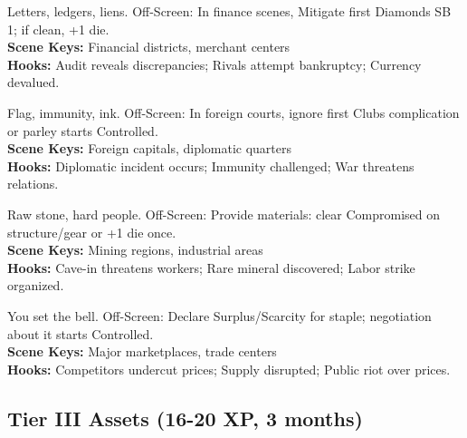\documentclass[12pt]{article}
\begin{document}
\begin{description}[leftmargin=*]
  \item[\textbf{Banking Charter}] Letters, ledgers, liens. Off-Screen: In finance scenes, Mitigate first Diamonds SB 1; if clean, +1 die. \\
  \textbf{Scene Keys:} Financial districts, merchant centers \\
  \textbf{Hooks:} Audit reveals discrepancies; Rivals attempt bankruptcy; Currency devalued.

  \item[\textbf{Diplomatic Enclave}] Flag, immunity, ink. Off-Screen: In foreign courts, ignore first Clubs complication or parley starts Controlled. \\
  \textbf{Scene Keys:} Foreign capitals, diplomatic quarters \\
  \textbf{Hooks:} Diplomatic incident occurs; Immunity challenged; War threatens relations.

  \item[\textbf{Mine/Quarry Operation}] Raw stone, hard people. Off-Screen: Provide materials: clear Compromised on structure/gear or +1 die once. \\
  \textbf{Scene Keys:} Mining regions, industrial areas \\
  \textbf{Hooks:} Cave-in threatens workers; Rare mineral discovered; Labor strike organized.

  \item[\textbf{Market Control}] You set the bell. Off-Screen: Declare Surplus/Scarcity for staple; negotiation about it starts Controlled. \\
  \textbf{Scene Keys:} Major marketplaces, trade centers \\
  \textbf{Hooks:} Competitors undercut prices; Supply disrupted; Public riot over prices.
\end{description}

\subsection*{Tier III Assets (16-20 XP, 3 months)}
\end{document}
